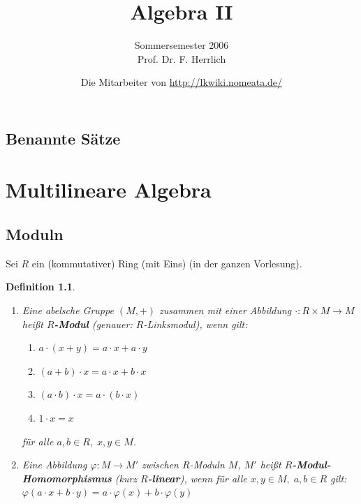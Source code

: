 \documentclass[a4paper,12pt]{scrbook}
\title{Algebra II}
\subtitle{Sommersemester 2006\\ Prof. Dr. F. Herrlich}
\author{Die Mitarbeiter von \url{http://lkwiki.nomeata.de/}}
\theoremstyle{break}
\newtheorem{Def}{Definition}[chapter]
\theoremstyle{nonumberbreak}
\theoremstyle{nonumberplain}
\newcommand{\emp}[1]{\textbf{\emph{#1}}}
\begin{document}
\maketitle

\setlength\parskip{0.6pt}
\tableofcontents

\section*{Benannte Sätze}


\setlength\parskip{\smallskipamount}


\chapter{Multilineare Algebra}

\section{Moduln}

Sei $R$ ein (kommutativer) Ring (mit Eins) (in der ganzen Vorlesung).

\begin{Def}
\label{1.1}
  \begin{enumerate}
    \item Eine abelsche Gruppe $(M,+)$ zusammen mit einer Abbildung
          $\cdot : R \times M \to M$ heißt \emp{$R$-Modul} (genauer:
          $R$-Linksmodul), wenn gilt:
          \begin{enumerate}
            \item[(i)] $a \cdot (x+y) = a \cdot x + a \cdot y$
            \item[(ii)] $(a+b) \cdot x = a \cdot x + b \cdot x$
            \item[(iii)] $(a \cdot b) \cdot x = a \cdot (b \cdot x)$
            \item[(iv)] $1 \cdot x = x$
          \end{enumerate}
          für alle $a,b \in R,\;x,y \in M$.
    \item Eine Abbildung $\varphi: M \to M'$ zwischen $R$-Moduln $M$, $M'$
          heißt \emp{$R$-Modul-Homo\-morphismus} (kurz
          \emp{$R$-linear}), wenn für alle $x,y \in M, \; a,b \in R$
          gilt:\\
          $\varphi (a \cdot x + b \cdot y) = a \cdot \varphi (x) + b \cdot
          \varphi (y)$
  \end{enumerate}
\end{Def}
\end{document}
